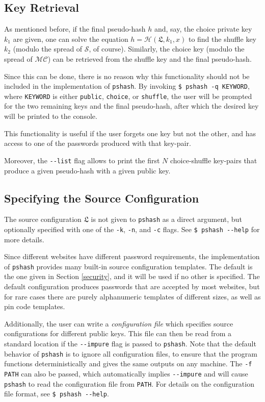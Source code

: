\documentclass[a4paper, 10pt]{article}
\theoremstyle{plain}
\theoremstyle{definition}
\newcommand{\conf}{\mathfrak{L}}
\newcommand{\mc}{\mathcal{MC}}
\newcommand{\h}{\mathcal{H}}
\newcommand{\s}{\mathcal{S}}
\begin{document}
\subsection{Key Retrieval}

As mentioned before, if the final pseudo-hash $h$ and, say, the choice private key $k_1$ are given, one can solve the equation $h = \h(\conf, k_1, x)$ to find the shuffle key $k_2$ (modulo the spread of $\s$, of course). Similarly, the choice key (modulo the spread of $\mc$) can be retrieved from the shuffle key and the final pseudo-hash.

Since this can be done, there is no reason why this functionality should not be included in the implementation of \texttt{pshash}. By invoking \verb|$ pshash -q KEYWORD|, where \verb|KEYWORD| is either \verb|public|, \verb|choice|, or \verb|shuffle|, the user will be prompted for the two remaining keys and the final pseudo-hash, after which the desired key will be printed to the console.

This functionality is useful if the user forgets one key but not the other, and has access to one of the passwords produced with that key-pair. 

Moreover, the \verb|--list| flag allows to print the first $N$ choice-shuffle key-pairs that produce a given pseudo-hash with a given public key.

\subsection{Specifying the Source Configuration} \label{conf}

The source configuration $\conf$ is not given to \texttt{pshash} as a direct argument, but optionally specified with one of the \verb|-k|, \verb|-n|, and \verb|-c| flags. See \verb|$ pshash --help| for more details.

Since different websites have different password requirements, the implementation of \texttt{pshash} provides many built-in source configuration templates. The default is the one given in Section \ref{security}, and it will be used if no other is specified. The default configuration produces passwords that are accepted by most websites, but for rare cases there are purely alphanumeric templates of different sizes, as well as pin code templates.

Additionally, the user can write a \emph{configuration file} which specifies source configurations for different public keys. This file can then be read from a standard location if the \verb|--impure| flag is passed to \texttt{pshash}. Note that the default behavior of \texttt{pshash} is to ignore all configuration files, to ensure that the program functions deterministically and gives the same outputs on any machine. The \verb|-f PATH| can also be passed, which automatically implies \verb|--impure| and will cause \texttt{pshash} to read the configuration file from \verb|PATH|. For details on the configuration file format, see \verb|$ pshash --help|.
\end{document}
